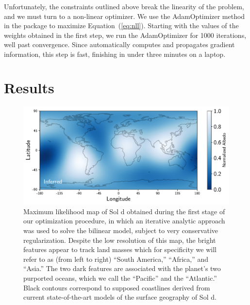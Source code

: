 \documentclass[modern]{aastex62}
\begin{document}
Unfortunately, the constraints outlined above break the linearity 
of the problem, and we must turn to a non-linear optimizer. We use the 
\textsf{AdamOptimizer} method in the \tf package \citep{Abadi2015}
to maximize Equation~(\ref{eq:nll}). Starting with the values of the
weights obtained in the first step, we run the \textsf{AdamOptimizer}
for 1000 iterations, well past convergence. Since \tf automatically
computes and propagates gradient information, this step is fast, 
finishing in under three minutes on a laptop.

\section{Results}
\label{sec:results}

\begin{figure}[t!]
    \begin{centering}
    \includegraphics[width=\linewidth]{figures/map_L2.pdf}
    \caption{\label{fig:map_L2}
             Maximum likelihood map of Sol d obtained during the first
             stage of our optimization procedure, in which an iterative
             analytic approach was used to solve the bilinear model, 
             subject to very conservative regularization. Despite the low
             resolution of this map, the bright features appear to track
             land masses which for specificity we will refer to as (from left to right)
             ``South America,'' ``Africa,'' and ``Asia.''
             The two dark features are associated with the planet's
             two purported oceans, which we call the ``Pacific'' and the ``Atlantic.'' 
	     Black contours correspond to supposed coastlines
             derived from current state-of-the-art models of the surface geography 
             of Sol d.             
             }
    \end{centering}
\end{figure}
\end{document}
